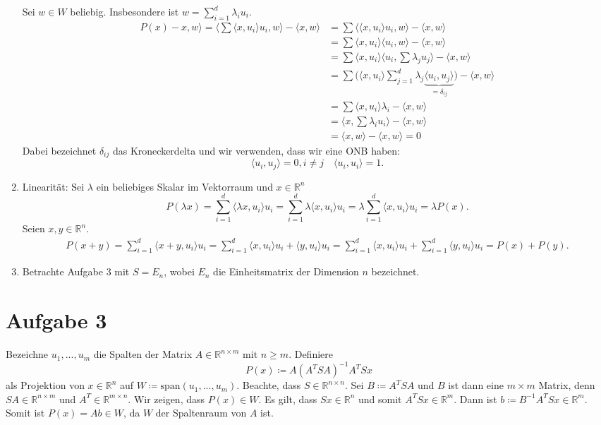 \documentclass[9pt]{extarticle}
\theoremstyle{named}
\begin{document}
\begin{enumerate}[label=(\roman*)]
	Sei $w \in W$ beliebig. Insbesondere ist $w = \sum_{i=1}^d \lambda_i u_i$.
	\begin{align*}
		P(x)-x, w \rangle 
		=  \langle \sum \langle x,u_i \rangle u_i, w \rangle - \langle x,w \rangle 
		&=  \sum \langle \langle x,u_i \rangle u_i, w \rangle - \langle x,w \rangle \\
		&= \sum \langle x,u_i \rangle \langle u_i, w \rangle - \langle x,w \rangle \\
		&= \sum \langle x,u_i \rangle \langle u_i, \sum \lambda_ju_j \rangle - \langle x,w \rangle \\
		&= \sum \Big( \langle x,u_i \rangle \sum_{j=1}^d \lambda_j \underbrace{\langle u_i, u_j \rangle}_{=\delta_{ij}}\Big) - \langle x,w \rangle \\
	    &= \sum \langle x,u_i \rangle \lambda_i - \langle x,w \rangle \\
		&= \langle x, \sum  \lambda_i u_i \rangle - \langle x,w \rangle \\
		&= \langle x, w \rangle - \langle x,w \rangle = 0  
	\end{align*}
	Dabei bezeichnet $\delta_{ij}$ das Kroneckerdelta und wir verwenden, dass wir eine ONB haben:
	\[
		\langle u_i, u_j \rangle = 0, i \neq j \quad \langle u_i,u_i \rangle = 1.
	\]
	
	\item Linearität: Sei $\lambda$ ein beliebiges Skalar im Vektorraum und $x \in \mathbb R^n$
	\[
		P(\lambda x) =  \sum^{d}_{i=1} \langle \lambda x,u_i \rangle u_i =  \sum^{d}_{i=1} \lambda \langle x,u_i \rangle u_i =  \lambda \sum^{d}_{i=1} \langle x,u_i \rangle u_i = \lambda P(x).
	\] 
	Seien $x,y \in \mathbb R^n$.
	\begin{align*}
		P(x+y) =  \sum^{d}_{i=1} \langle x+y,u_i \rangle u_i =  \sum^{d}_{i=1} \langle x,u_i \rangle u_i + \langle y,u_i \rangle u_i = \sum^{d}_{i=1} \langle x,u_i \rangle u_i +  \sum^{d}_{i=1} \langle y,u_i \rangle u_i = P(x) + P(y).
	\end{align*}
	
	\item Betrachte Aufgabe 3 mit $S = E_n$, wobei $E_n$ die Einheitsmatrix der Dimension $n$ bezeichnet.
\end{enumerate}

\section*{Aufgabe 3}
Bezeichne $u_1,...,u_m$ die Spalten der Matrix $A \in \mathbb R^{n \times m}$ mit $n \geq m$. Definiere
\[
	P(x) \coloneqq A(A^TSA)^{-1}A^TSx
\]
als Projektion von $x \in \mathbb R^n$ auf $W \coloneqq \mathrm{span}(u_1,...,u_m)$. Beachte, dass $S \in \mathbb R^{n \times n}$. Sei $B \coloneqq A^TSA$ und $B$ ist dann eine $m \times m$ Matrix, denn $SA \in \mathbb R^{n \times m}$ und $A^T \in \mathbb R^{m \times n}$. Wir zeigen, dass $P(x) \in W$. Es gilt, dass $Sx \in \mathbb R^n$ und somit $A^TSx \in \mathbb R^m$. Dann ist $b \coloneqq B^{-1}A^TSx \in \mathbb R^{m}$. Somit ist $P(x) = Ab \in W$, da $W$ der Spaltenraum von $A$ ist.\\
\end{document}
